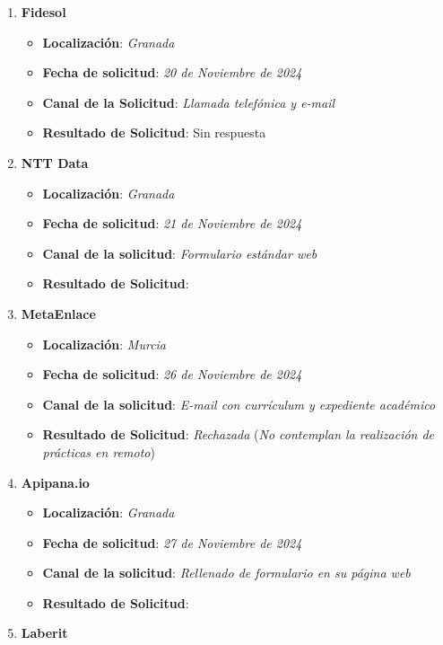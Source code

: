 \begin{enumerate}
	\item {\large \textbf{Fidesol}}
	\begin{itemize}
		\item \textbf{Localización}: \textit{Granada}
		\item \textbf{Fecha de solicitud}: \textit{20 de Noviembre de 2024}
		\item \textbf{Canal de la Solicitud}: \textit{Llamada telefónica y e-mail}
		\item \textbf{Resultado de Solicitud}: Sin respuesta
	\end{itemize}
	\item {\large\textbf{NTT Data}}
		\begin{itemize}
		\item \textbf{Localización}: \textit{Granada}
		\item \textbf{Fecha de solicitud}: \textit{21 de Noviembre de 2024}
		\item \textbf{Canal de la solicitud}: \textit{Formulario estándar web}
		\item \textbf{Resultado de Solicitud}: 
	\end{itemize}
		\item {\large\textbf{MetaEnlace}}
	\begin{itemize}
		\item \textbf{Localización}: \textit{Murcia}
		\item \textbf{Fecha de solicitud}: \textit{26 de Noviembre de 2024}
		\item \textbf{Canal de la solicitud}: \textit{E-mail con currículum y expediente académico}
		\item \textbf{Resultado de Solicitud}: \textit{Rechazada} (\textit{No contemplan la realización de prácticas en remoto})
	\end{itemize}
		\item \textbf{Apipana.io}
		\begin{itemize}
		\item \textbf{Localización}: \textit{Granada}
		\item \textbf{Fecha de solicitud}: \textit{27 de Noviembre de 2024}
		\item \textbf{Canal de la solicitud}: \textit{Rellenado de formulario en su página web}
		\item \textbf{Resultado de Solicitud}: 
	\end{itemize}
	\item \textbf{Laberit}
	\begin{itemize}

\end{itemize}
\end{enumerate}
